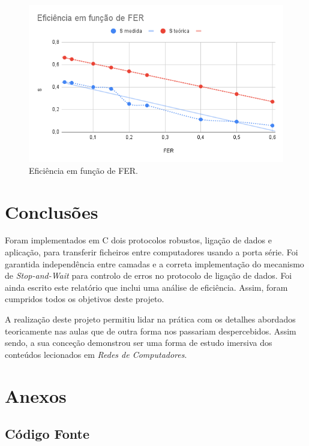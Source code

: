 \documentclass[a4paper,11pt,portuguese]{article}
\begin{document}
    \begin{figure}[H]
        \centering
        \includegraphics[scale=0.5]{./imgs/fer.png}
        \caption{Eficiência em função de FER.}
        \label{fig:fer}
    \end{figure}


\section{Conclusões}

    Foram implementados em C dois protocolos robustos, ligação de dados e aplicação, para
    transferir ficheiros entre computadores usando a porta série. Foi garantida
    independência entre camadas e a correta implementação do mecanismo de
    \textit{Stop-and-Wait} para controlo de erros no protocolo de ligação
    de dados. Foi ainda escrito este relatório que inclui uma análise de eficiência.
    Assim, foram cumpridos todos os objetivos deste projeto. \par

    A realização deste projeto permitiu lidar na prática com os detalhes abordados
    teoricamente nas aulas que de outra forma nos passariam despercebidos. Assim sendo,
    a sua conceção demonstrou ser uma forma de estudo imersiva dos conteúdos lecionados
    em \textit{Redes de Computadores}.


\newpage

\section{Anexos}
\subsection{Código Fonte}
\end{document}
